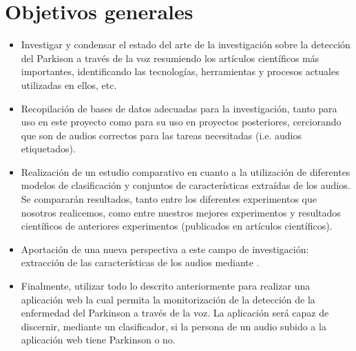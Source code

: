 
\section{Objetivos generales}
\begin{itemize}
	\item Investigar y condensar el estado del arte de la investigación sobre la detección del Parkison a través de la voz resumiendo los artículos científicos más importantes, identificando las tecnologías, herramientas y procesos actuales utilizadas en ellos, etc.
	\item Recopilación de bases de datos adecuadas para la investigación, tanto para uso en este proyecto como para su uso en proyectos posteriores, cerciorando que son  de audios correctos para las tareas necesitadas (i.e. audios etiquetados).
	\item Realización de un estudio comparativo en cuanto a la utilización de diferentes modelos de clasificación y conjuntos de características extraídas de los audios. Se compararán resultados, tanto entre los diferentes experimentos que nosotros realicemos, como entre nuestros mejores experimentos y resultados científicos de anteriores experimentos (publicados en artículos científicos).
	\item Aportación de una nueva perspectiva a este campo de investigación: extracción de las características de los audios mediante .
	\item Finalmente, utilizar todo lo descrito anteriormente para realizar una aplicación web la cual permita la monitorización de la detección de la enfermedad del Parkinson a través de la voz. La aplicación será capaz de discernir, mediante un clasificador, si la persona de un audio subido a la aplicación web tiene Parkinson o no.
\end{itemize}

